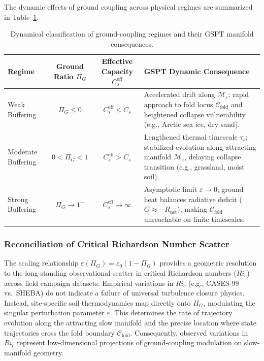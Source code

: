\documentclass[11pt]{article}
\begin{document}
The dynamic effects of ground coupling across physical regimes are summarized in Table~\ref{tab:ground_coupling_regimes}.

\begin{table}[htbp]
\centering
\caption{Dynamical classification of ground-coupling regimes and their GSPT manifold consequences.}
\label{tab:ground_coupling_regimes}
\begin{tabular}{l c c p{6.5cm}}
\toprule
\textbf{Regime} & \textbf{Ground Ratio $\Pi_G$} & \textbf{Effective Capacity $C_s^{\text{eff}}$} & \textbf{GSPT Dynamic Consequence} \\
\midrule
Weak Buffering & $\Pi_G \le 0$ & $C_s^{\text{eff}} \le C_s$ & Accelerated drift along $\mathcal{M}_\varepsilon$; rapid approach to fold locus $\mathcal{C}_{\text{fold}}$ and heightened collapse vulnerability (e.g., Arctic sea ice, dry sand). \\
\addlinespace
Moderate Buffering & $0 < \Pi_G < 1$ & $C_s^{\text{eff}} > C_s$ & Lengthened thermal timescale $\tau_s$; stabilized evolution along attracting manifold $\mathcal{M}_\varepsilon$, delaying collapse transition (e.g., grassland, moist soil). \\
\addlinespace
Strong Buffering & $\Pi_G \to 1^-$ & $C_s^{\text{eff}} \to \infty$ & Asymptotic limit $\varepsilon \to 0$; ground heat balances radiative deficit ($G \approx -R_{\text{net}}$), making $\mathcal{C}_{\text{fold}}$ unreachable on finite timescales. \\
\bottomrule
\end{tabular}
\end{table}

\subsubsection{Reconciliation of Critical Richardson Number Scatter}
The scaling relationship $\varepsilon(\Pi_G) = \varepsilon_0 (1 - \Pi_G)$ provides a geometric resolution to the long-standing observational scatter in critical Richardson numbers ($Ri_c$) across field campaign datasets. Empirical variations in $Ri_c$ (e.g., CASES-99 vs.\ SHEBA) do not indicate a failure of universal turbulence closure physics. Instead, site-specific soil thermodynamics map directly onto $\Pi_G$, modulating the singular perturbation parameter $\varepsilon$. This determines the rate of trajectory evolution along the attracting slow manifold and the precise location where state trajectories cross the fold boundary $\mathcal{C}_{\text{fold}}$. Consequently, observed variations in $Ri_c$ represent low-dimensional projections of ground-coupling modulation on slow-manifold geometry.
\end{document}
